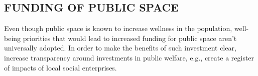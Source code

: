 \subsection*{\normalsize{} FUNDING OF PUBLIC SPACE{\hfill \cognitive}}\label{pat:funding-of-public-space}

Even though public space is known to increase wellness in the
population, well-being priorities that would lead to increased funding
for public space aren’t universally adopted.  In order to make the
benefits of such investment clear, increase transparency around
investments in public welfare, e.g., create a register of impacts of
local social enterprises.
